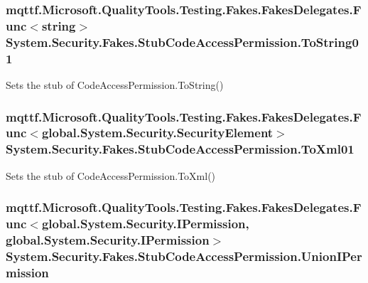 \hypertarget{class_system_1_1_security_1_1_fakes_1_1_stub_code_access_permission_ac9283b2519c7b1b664085acf463c2a55}{
\subsubsection[{To\-String01}]{\setlength{\rightskip}{0pt plus 5cm}mqttf.\-Microsoft.\-Quality\-Tools.\-Testing.\-Fakes.\-Fakes\-Delegates.\-Func$<$string$>$ System.\-Security.\-Fakes.\-Stub\-Code\-Access\-Permission.\-To\-String01}}\label{class_system_1_1_security_1_1_fakes_1_1_stub_code_access_permission_ac9283b2519c7b1b664085acf463c2a55}


Sets the stub of Code\-Access\-Permission.\-To\-String()

\hypertarget{class_system_1_1_security_1_1_fakes_1_1_stub_code_access_permission_afaaf6886a9d64400a3746ddb276f9b91}{
\subsubsection[{To\-Xml01}]{\setlength{\rightskip}{0pt plus 5cm}mqttf.\-Microsoft.\-Quality\-Tools.\-Testing.\-Fakes.\-Fakes\-Delegates.\-Func$<$global.\-System.\-Security.\-Security\-Element$>$ System.\-Security.\-Fakes.\-Stub\-Code\-Access\-Permission.\-To\-Xml01}}\label{class_system_1_1_security_1_1_fakes_1_1_stub_code_access_permission_afaaf6886a9d64400a3746ddb276f9b91}


Sets the stub of Code\-Access\-Permission.\-To\-Xml()

\hypertarget{class_system_1_1_security_1_1_fakes_1_1_stub_code_access_permission_a402e45c4d970be3301b0950114c9768d}{
\subsubsection[{Union\-I\-Permission}]{\setlength{\rightskip}{0pt plus 5cm}mqttf.\-Microsoft.\-Quality\-Tools.\-Testing.\-Fakes.\-Fakes\-Delegates.\-Func$<$global.\-System.\-Security.\-I\-Permission, global.\-System.\-Security.\-I\-Permission$>$ System.\-Security.\-Fakes.\-Stub\-Code\-Access\-Permission.\-Union\-I\-Permission}}\label{class_system_1_1_security_1_1_fakes_1_1_stub_code_access_permission_a402e45c4d970be3301b0950114c9768d}


